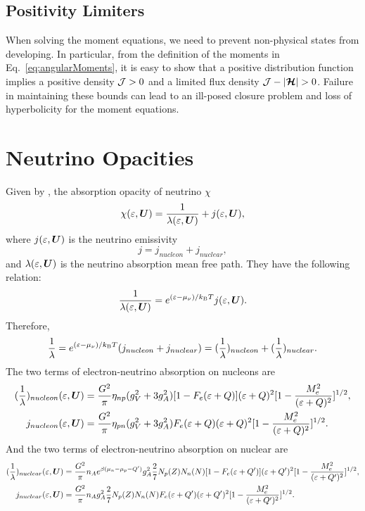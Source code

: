 \documentclass[10pt,preprint]{aastex}
\newcommand{\ee}[1]{{\color{red} #1}}
\begin{document}
\subsection{Positivity Limiters}
\label{sec:positivityLimiters}

When solving the moment equations, we need to prevent non-physical states from developing.  
In particular, from the definition of the moments in Eq.~\eqref{eq:angularMoments}, it is easy to show that a positive distribution function implies a positive density $\mathcal{J}>0$ and a limited flux density $\cJ-|\bcH|>0$.  
Failure in maintaining these bounds can lead to an ill-posed closure problem and loss of hyperbolicity for the moment equations.  

\section{Neutrino Opacities}


Given by \citet{bruenn_1985}, the absorption opacity of neutrino $\chi$ 
\begin{equation}
  \chi(\varepsilon,\boldsymbol{U}) = \dfrac{1}{\lambda(\varepsilon,\boldsymbol{U})} + j(\varepsilon,\boldsymbol{U}), 
\end{equation}
where $j(\varepsilon,\boldsymbol{U}) $ is the neutrino emissivity
\begin{equation}
j = j_{nucleon} + j_{nuclear},
\end{equation}  
and $\lambda(\varepsilon,\boldsymbol{U})$ is the neutrino absorption mean free path.
They have the following relation:
\begin{equation}
\dfrac{1}{\lambda(\varepsilon,\boldsymbol{U})} = e^{(\varepsilon-\mu_{\nu})/k_{\mbox{\tiny B}}T} j(\varepsilon,\boldsymbol{U}) .
\end{equation}
Therefore,
\begin{equation}
\dfrac{1}{\lambda} = e^{(\varepsilon-\mu_{\nu})/k_{\mbox{\tiny B}}T} (j_{nucleon} + j_{nuclear} ) = (\dfrac{1}{\lambda})_{nucleon} + (\dfrac{1}{\lambda})_{nuclear}.
\end{equation}
The two terms of electron-neutrino absorption on nucleons are
 \begin{align}
    (\dfrac{1}{\lambda})_{nucleon}(\varepsilon,\boldsymbol{U}) & = \dfrac{G^2}{\pi} \eta_{np}(g_V^2+3g_A^2)[1-F_e(\varepsilon+Q)](\varepsilon+Q)^2[1-\dfrac{M^2_e}{(\varepsilon+Q)^2}]^{1/2},\\
    j_{nucleon}(\varepsilon,\boldsymbol{U}) &= \dfrac{G^2}{\pi}\eta_{pn}(g_V^2+3g_A^2)F_e(\varepsilon+Q)(\varepsilon+Q)^2[1-\dfrac{M^2_e}{(\varepsilon+Q)^2}]^{1/2}.
\end{align}
And the two terms of electron-neutrino absorption on nuclear are
\begin{align}
    (\dfrac{1}{\lambda})_{nuclear}(\varepsilon,\boldsymbol{U}) & = \dfrac{G^2}{\pi} n_A e^{\beta (\mu_n -\mu_p -Q')} g^2_A \dfrac{2}{7} N_p(Z) N_n(N)[1-F_e(\varepsilon+Q')](\varepsilon+Q')^2[1-\dfrac{M_e^2}{(\varepsilon+Q')^2}]^{1/2} ,\\
    j_{nuclear}(\varepsilon,\boldsymbol{U}) &=\dfrac{G^2}{\pi} n_A g^2_A \dfrac{2}{7} N_p(Z) N_n(N)F_e(\varepsilon+Q')(\varepsilon+Q')^2[1-\dfrac{M_e^2}{(\varepsilon+Q')^2}]^{1/2} .
\end{align} 
\end{document}
